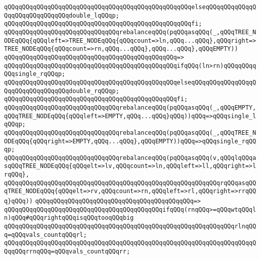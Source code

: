\verb|qQQqqQQqqQQqqQQqqQQqqQQqqQQqqQQqqQQqqQQqqQQqqQQqqQQqelseqQQqqQQqqQQqqQQqqQQqqQQqqQQqqQQqdouble_lqQQqp;|\newline
\verb|qQQqqQQqqQQqqQQqqQQqqQQqqQQqqQQqqQQqqQQqqQQqqQQqqQQqfi;|\newline
\newline
\verb|qQQqqQQqqQQqqQQqqQQqqQQqqQQqqQQqrebalanceqQQq(pqQQqasqQQq(_,qQQqTREE_NODEqQQq{qQQqleft=>TREE_NODEqQQq{qQQqcount=>ln,qQQq...qQQq},qQQqright=>TREE_NODEqQQq{qQQqcount=>rn,qQQq...qQQq},qQQq...qQQq},qQQqEMPTY))|\newline
\verb|qQQqqQQqqQQqqQQqqQQqqQQqqQQqqQQqqQQqqQQqqQQqqQQq=>|\newline
\verb|qQQqqQQqqQQqqQQqqQQqqQQqqQQqqQQqqQQqqQQqqQQqqQQqifqQQq(ln>rn)qQQqqQQqqQQqsingle_rqQQqp;|\newline
\verb|qQQqqQQqqQQqqQQqqQQqqQQqqQQqqQQqqQQqqQQqqQQqqQQqelseqQQqqQQqqQQqqQQqqQQqqQQqqQQqqQQqqQQqdouble_rqQQqp;|\newline
\verb|qQQqqQQqqQQqqQQqqQQqqQQqqQQqqQQqqQQqqQQqqQQqqQQqfi;|\newline
\newline
\verb|qQQqqQQqqQQqqQQqqQQqqQQqqQQqqQQqrebalanceqQQq(pqQQqasqQQq(_,qQQqEMPTY,qQQqTREE_NODEqQQq{qQQqleft=>EMPTY,qQQq...qQQq}qQQq))qQQq=>qQQqsingle_lqQQqp;|\newline
\verb|qQQqqQQqqQQqqQQqqQQqqQQqqQQqqQQqrebalanceqQQq(pqQQqasqQQq(_,qQQqTREE_NODEqQQq{qQQqright=>EMPTY,qQQq...qQQq},qQQqEMPTY))qQQq=>qQQqsingle_rqQQqp;|\newline
\newline
\verb|qQQqqQQqqQQqqQQqqQQqqQQqqQQqqQQqrebalanceqQQq(pqQQqasqQQq(v,qQQqlqQQqasqQQqTREE_NODEqQQq{qQQqelt=>lv,qQQqcount=>ln,qQQqleft=>ll,qQQqright=>lrqQQq},|\newline
\verb|qQQqqQQqqQQqqQQqqQQqqQQqqQQqqQQqqQQqqQQqqQQqqQQqqQQqqQQqqQQqrqQQqasqQQqTREE_NODEqQQq{qQQqelt=>rv,qQQqcount=>rn,qQQqleft=>rl,qQQqright=>rrqQQq}qQQq))|\newline
\verb|qQQqqQQqqQQqqQQqqQQqqQQqqQQqqQQqqQQqqQQqqQQq=>|\newline
\verb|qQQqqQQqqQQqqQQqqQQqqQQqqQQqqQQqqQQqqQQqqQQqifqQQq(rnqQQq>=qQQqwtqQQqln)qQQq#qQQqrightqQQqisqQQqtooqQQqbig|\newline
\newline
\verb|qQQqqQQqqQQqqQQqqQQqqQQqqQQqqQQqqQQqqQQqqQQqqQQqqQQqqQQqqQQqqQQqrlnqQQq=qQQqvals_countqQQqrl;|\newline
\verb|qQQqqQQqqQQqqQQqqQQqqQQqqQQqqQQqqQQqqQQqqQQqqQQqqQQqqQQqqQQqqQQqqQQqqQQqqQQqrrnqQQq=qQQqvals_countqQQqrr;|\newline
